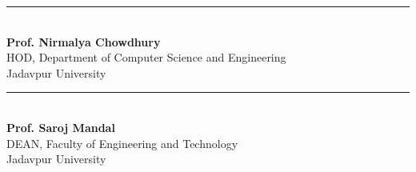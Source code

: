 \vspace{1.0cm}



\noindent \rule[0.10ex]{8cm}{0.4pt} \\
\noindent
\textbf{Prof. Nirmalya Chowdhury} \\
HOD, Department of Computer Science and Engineering \\
Jadavpur University

\vspace{1.5cm}

\noindent \rule[0.10ex]{8cm}{0.4pt} \\
\noindent
\textbf{Prof. Saroj Mandal} \\
DEAN, Faculty of Engineering and Technology \\
Jadavpur University